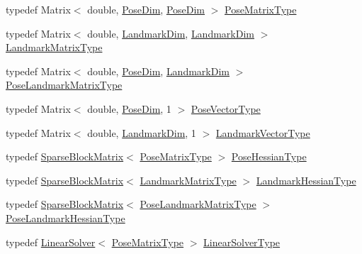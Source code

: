 \begin{DoxyCompactItemize}
\item 
typedef Matrix$<$ double, \mbox{\hyperlink{structg2o_1_1_block_solver_traits_a90a03bcfc60b629da5601f6df9514297}{Pose\+Dim}}, \mbox{\hyperlink{structg2o_1_1_block_solver_traits_a90a03bcfc60b629da5601f6df9514297}{Pose\+Dim}} $>$ \mbox{\hyperlink{structg2o_1_1_block_solver_traits_a35e6e4bad138dcfcaa3b1339e168bf30}{Pose\+Matrix\+Type}}
\item 
typedef Matrix$<$ double, \mbox{\hyperlink{structg2o_1_1_block_solver_traits_a7e6e33971e5243e020a9f41cd3182218}{Landmark\+Dim}}, \mbox{\hyperlink{structg2o_1_1_block_solver_traits_a7e6e33971e5243e020a9f41cd3182218}{Landmark\+Dim}} $>$ \mbox{\hyperlink{structg2o_1_1_block_solver_traits_add9b9fbfef352b7654d41914d5eaa58c}{Landmark\+Matrix\+Type}}
\item 
typedef Matrix$<$ double, \mbox{\hyperlink{structg2o_1_1_block_solver_traits_a90a03bcfc60b629da5601f6df9514297}{Pose\+Dim}}, \mbox{\hyperlink{structg2o_1_1_block_solver_traits_a7e6e33971e5243e020a9f41cd3182218}{Landmark\+Dim}} $>$ \mbox{\hyperlink{structg2o_1_1_block_solver_traits_a91e6510ad42179701d22c3ac312237cd}{Pose\+Landmark\+Matrix\+Type}}
\item 
typedef Matrix$<$ double, \mbox{\hyperlink{structg2o_1_1_block_solver_traits_a90a03bcfc60b629da5601f6df9514297}{Pose\+Dim}}, 1 $>$ \mbox{\hyperlink{structg2o_1_1_block_solver_traits_a032ed57e9bc44c36093f97b32e1506f6}{Pose\+Vector\+Type}}
\item 
typedef Matrix$<$ double, \mbox{\hyperlink{structg2o_1_1_block_solver_traits_a7e6e33971e5243e020a9f41cd3182218}{Landmark\+Dim}}, 1 $>$ \mbox{\hyperlink{structg2o_1_1_block_solver_traits_af5154a15abb566ff5bffc0adb9f0458d}{Landmark\+Vector\+Type}}
\item 
typedef \mbox{\hyperlink{classg2o_1_1_sparse_block_matrix}{Sparse\+Block\+Matrix}}$<$ \mbox{\hyperlink{structg2o_1_1_block_solver_traits_a35e6e4bad138dcfcaa3b1339e168bf30}{Pose\+Matrix\+Type}} $>$ \mbox{\hyperlink{structg2o_1_1_block_solver_traits_a03351362339d8e6609c577123350bb2a}{Pose\+Hessian\+Type}}
\item 
typedef \mbox{\hyperlink{classg2o_1_1_sparse_block_matrix}{Sparse\+Block\+Matrix}}$<$ \mbox{\hyperlink{structg2o_1_1_block_solver_traits_add9b9fbfef352b7654d41914d5eaa58c}{Landmark\+Matrix\+Type}} $>$ \mbox{\hyperlink{structg2o_1_1_block_solver_traits_ae761bb32d5267e4d74e5d9c2c7e7ad2f}{Landmark\+Hessian\+Type}}
\item 
typedef \mbox{\hyperlink{classg2o_1_1_sparse_block_matrix}{Sparse\+Block\+Matrix}}$<$ \mbox{\hyperlink{structg2o_1_1_block_solver_traits_a91e6510ad42179701d22c3ac312237cd}{Pose\+Landmark\+Matrix\+Type}} $>$ \mbox{\hyperlink{structg2o_1_1_block_solver_traits_af8ef27915a056caae3b12a9ca609eba6}{Pose\+Landmark\+Hessian\+Type}}
\item 
typedef \mbox{\hyperlink{classg2o_1_1_linear_solver}{Linear\+Solver}}$<$ \mbox{\hyperlink{structg2o_1_1_block_solver_traits_a35e6e4bad138dcfcaa3b1339e168bf30}{Pose\+Matrix\+Type}} $>$ \mbox{\hyperlink{structg2o_1_1_block_solver_traits_add6edae08cb0665c2b1e7c641cdb4dc4}{Linear\+Solver\+Type}}
\end{DoxyCompactItemize}
